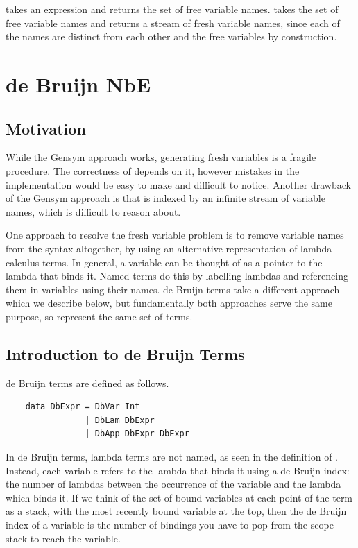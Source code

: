  takes an expression and returns the set of free variable names.  takes the set of free variable names and returns a stream of fresh variable names, since each of the names are distinct from each other and the free variables by construction.

\section{de Bruijn NbE}

\subsection{Motivation}

While the Gensym approach works, generating fresh variables is a fragile procedure. The correctness of  depends on it, however mistakes in the implementation would be easy to make and difficult to notice. Another drawback of the Gensym approach is that  is indexed by an infinite stream of variable names, which is difficult to reason about.

One approach to resolve the fresh variable problem is to remove variable names from the syntax altogether, by using an alternative representation of lambda calculus terms. In general, a variable can be thought of as a pointer to the lambda that binds it. Named terms do this by labelling lambdas and referencing them in variables using their names. de Bruijn terms take a different approach which we describe below, but fundamentally both approaches serve the same purpose, so represent the same set of terms.

\subsection{Introduction to de Bruijn Terms}

de Bruijn terms are defined as follows. \cite{deBruijnNotation}

\begin{lstlisting}
    data DbExpr = DbVar Int
                | DbLam DbExpr
                | DbApp DbExpr DbExpr
\end{lstlisting}

In de Bruijn terms, lambda terms are not named, as seen in the definition of . Instead, each variable refers to the lambda that binds it using a de Bruijn index: the number of lambdas between the occurrence of the variable and the lambda which binds it. If we think of the set of bound variables at each point of the term as a stack, with the most recently bound variable at the top, then the de Bruijn index of a variable is the number of bindings you have to pop from the scope stack to reach the variable.

